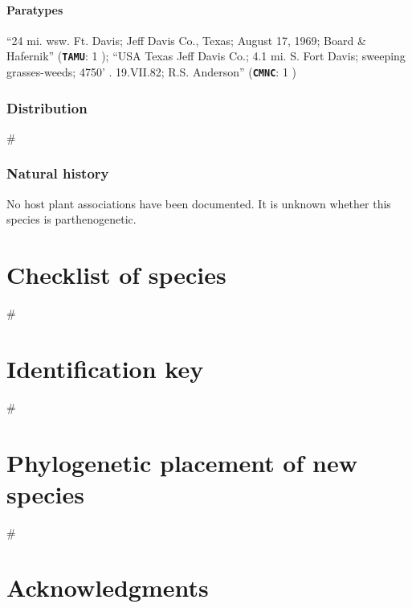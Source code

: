 \documentclass[fleqn,10pt,lineno]{wlpeerj} %
\begin{document}
			\paragraph{Paratypes}
				``24 mi. wsw. Ft. Davis; Jeff Davis Co., Texas; August 17, 1969; Board \& Hafernik'' (\texttt{\textbf{TAMU}}: 1 \female);
				``USA Texas Jeff Davis Co.; 4.1 mi. S. Fort Davis; sweeping grasses-weeds; 4750' . 19.VII.82; R.S. Anderson'' (\texttt{\textbf{CMNC}}: 1 \female)
		\subsubsection*{Distribution}
			\#
		\subsubsection*{Natural history}
			No host plant associations have been documented.
			It is unknown whether this species is parthenogenetic.
			
\section*{Checklist of species}
	\#
\section*{Identification key}
	\#
\section*{Phylogenetic placement of new species}
	\#
\section*{Acknowledgments}

\newpage
 
\end{document}
